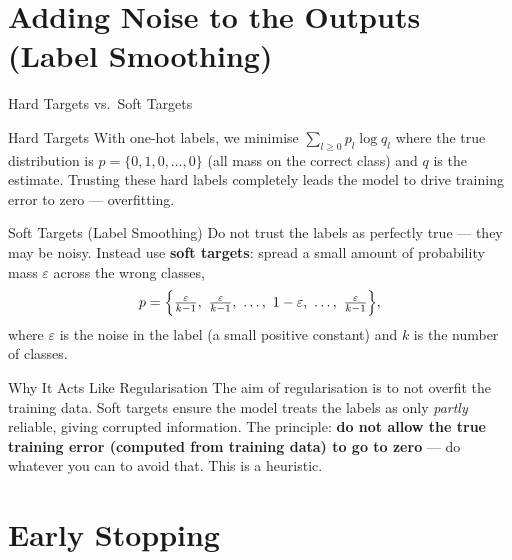 \documentclass{beamer}
\begin{document}
\section{Adding Noise to the Outputs (Label Smoothing)}

\begin{frame}[shrink=10]{Hard Targets vs.\ Soft Targets}
  \begin{block}{Hard Targets}
    With one-hot labels, we minimise $\sum_{l\ge 0} p_l\log q_l$ where the
    true distribution is $p = \{0,1,0,\ldots,0\}$ (all mass on the correct
    class) and $q$ is the estimate. Trusting these hard labels completely
    leads the model to drive training error to zero --- overfitting.
  \end{block}

  \begin{block}{Soft Targets (Label Smoothing)}
    Do not trust the labels as perfectly true --- they may be noisy.
    Instead use \textbf{soft targets}: spread a small amount of probability
    mass $\varepsilon$ across the wrong classes,
    \[
      p = \Bigl\{\tfrac{\varepsilon}{k-1},\ \tfrac{\varepsilon}{k-1},\ \ldots,\ 1-\varepsilon,\ \ldots,\ \tfrac{\varepsilon}{k-1}\Bigr\},
    \]
    where $\varepsilon$ is the noise in the label (a small positive
    constant) and $k$ is the number of classes.
  \end{block}

  \begin{exampleblock}{Why It Acts Like Regularisation}
    The aim of regularisation is to not overfit the training data. Soft
    targets ensure the model treats the labels as only \emph{partly}
    reliable, giving corrupted information. The principle: \textbf{do not
    allow the true training error (computed from training data) to go to
    zero} --- do whatever you can to avoid that. This is a heuristic.
  \end{exampleblock}
\end{frame}

\section{Early Stopping}
\end{document}
